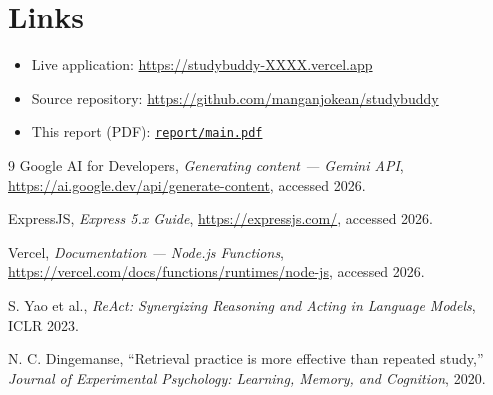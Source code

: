 \documentclass[11pt,a4paper]{article}
\newcommand{\appurl}{https://studybuddy-XXXX.vercel.app}
\newcommand{\repourl}{https://github.com/manganjokean/studybuddy}
\begin{document}
\section*{Links}
\begin{itemize}[leftmargin=*]
  \item Live application: \url{\appurl}
  \item Source repository: \url{\repourl}
  \item This report (PDF): \href{\repourl/blob/main/report/main.pdf}{\texttt{report/main.pdf}}
\end{itemize}

\begin{thebibliography}{9}
Google AI for Developers, \emph{Generating content --- Gemini API},
\url{https://ai.google.dev/api/generate-content}, accessed 2026.

ExpressJS, \emph{Express 5.x Guide}, \url{https://expressjs.com/}, accessed 2026.

Vercel, \emph{Documentation --- Node.js Functions},
\url{https://vercel.com/docs/functions/runtimes/node-js}, accessed 2026.

S. Yao et al., \emph{ReAct: Synergizing Reasoning and Acting in Language Models},
ICLR 2023.

N. C. Dingemanse, ``Retrieval practice is more effective than repeated study,''
\emph{Journal of Experimental Psychology: Learning, Memory, and Cognition}, 2020.
\end{thebibliography}
\end{document}
